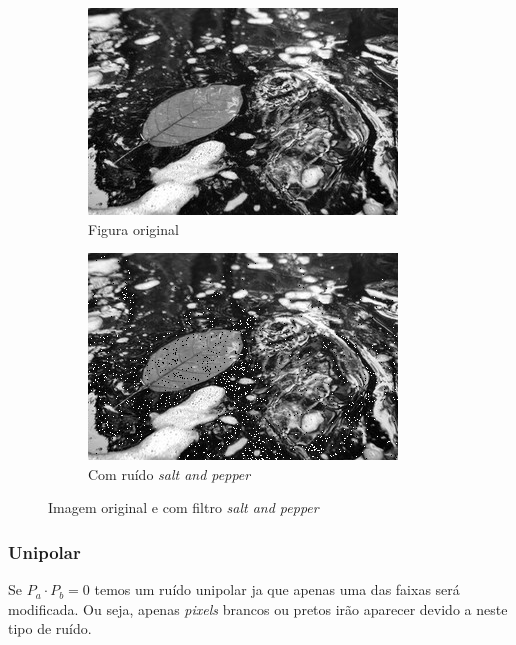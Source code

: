 \documentclass[10pt,a4paper]{article}
\newcommand{\pixels}{\textit{pixels} }
\begin{document}
\begin{figure}[!ht]
    \centering
    \begin{subfigure}[ht]{0.45\textwidth}
        \includegraphics[width=\textwidth]{src.jpg}
        \caption{Figura original}
        \label{fig:src}
    \end{subfigure}
    \qquad
    \begin{subfigure}[ht]{0.45\textwidth}
        \includegraphics[width=\textwidth]{dst_sp.jpg}
        \caption{Com ruído \textit{salt and pepper}}
        \label{fig:salt_and_pepper}
    \end{subfigure}
    \caption{Imagem original e com filtro \textit{salt and pepper}}
\end{figure}

\subsubsection{Unipolar}
Se $P_a \cdot P_b = 0$ temos um ruído unipolar ja que apenas uma das faixas será modificada. Ou seja, apenas \pixels brancos ou pretos irão aparecer devido a neste tipo de ruído.
\end{document}
